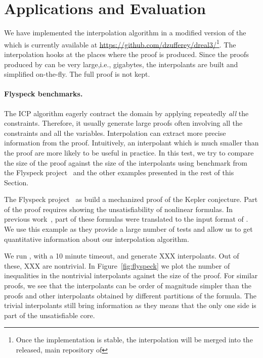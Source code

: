 \section{Applications and Evaluation}
\label{sec:eval}

We have implemented the interpolation algorithm in a modified version of the \dReal which is currently available at \url{https://github.com/dzufferey/dreal3/}\footnote{Once the implementation is stable, the interpolation will be merged into the released, main repository of \dReal}.
The interpolation hooks at the places where the proof is produced.
Since the proofs produced by \dReal can be very large,i.e., gigabytes, the interpolants are built and simplified on-the-fly.
The full proof is not kept.

\paragraph{Flyspeck benchmarks.}
The ICP algorithm eagerly contract the domain by applying repeatedly \emph{all} the constraints. Therefore, it usually generate large proofs often involving all the constraints and all the variables.
Interpolation can extract more precise information from the proof.
Intuitively, an interpolant which is much smaller than the proof are more likely to be useful in practice.
In this test, we try to compare the size of the proof against the size of the interpolants using benchmark from the Flyspeck project~\cite{???} and the other examples presented in the rest of this Section.

The Flyspeck project~\cite{???} as build a mechanized proof of the Kepler conjecture.
Part of the proof requires showing the unsatisfiability of nonlinear formulas.
In previous work~\cite{???}, part of these formulas were translated to the input format of \dReal.
We use this example as they provide a large number of tests and allow us to get quantitative information about our interpolation algorithm.

We run \dReal, with a 10 minute timeout, and generate XXX interpolants.
Out of these, XXX are nontrivial.
In Figure~\ref{fig:flyspeck} we plot the number of inequalities in the nontrivial interpolants against the size of the proof.
For similar proofs, we see that the interpolants can be order of magnitude simpler than the proofs and other interpolants obtained by different partitions of the formula.
The trivial interpolants still bring information as they means that the only one side is part of the unsatisfiable core.


